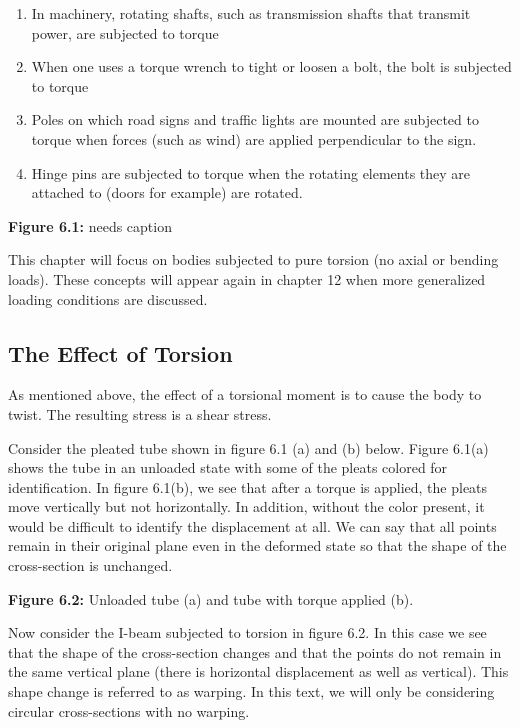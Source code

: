 \documentclass[
  letterpaper,
  DIV=11,
  numbers=noendperiod]{scrreprt}
\providecommand{\tightlist}{%
  \setlength{\itemsep}{0pt}\setlength{\parskip}{0pt}}\usepackage{longtable,booktabs,array}
\begin{document}
\begin{enumerate}
\def\labelenumi{\arabic{enumi}.}
\tightlist
\item
  In machinery, rotating shafts, such as transmission shafts that
  transmit power, are subjected to torque
\item
  When one uses a torque wrench to tight or loosen a bolt, the bolt is
  subjected to torque
\item
  Poles on which road signs and traffic lights are mounted are subjected
  to torque when forces (such as wind) are applied perpendicular to the
  sign.
\item
  Hinge pins are subjected to torque when the rotating elements they are
  attached to (doors for example) are rotated.
\end{enumerate}

\textbf{Figure 6.1:} needs caption

This chapter will focus on bodies subjected to pure torsion (no axial or
bending loads). These concepts will appear again in chapter 12 when more
generalized loading conditions are discussed.

\subsection{The Effect of Torsion}\label{the-effect-of-torsion}

As mentioned above, the effect of a torsional moment is to cause the
body to twist. The resulting stress is a shear stress.

Consider the pleated tube shown in figure 6.1 (a) and (b) below. Figure
6.1(a) shows the tube in an unloaded state with some of the pleats
colored for identification. In figure 6.1(b), we see that after a torque
is applied, the pleats move vertically but not horizontally. In
addition, without the color present, it would be difficult to identify
the displacement at all. We can say that all points remain in their
original plane even in the deformed state so that the shape of the
cross-section is unchanged.

\textbf{Figure 6.2:} Unloaded tube (a) and tube with torque applied (b).

Now consider the I-beam subjected to torsion in figure 6.2. In this case
we see that the shape of the cross-section changes and that the points
do not remain in the same vertical plane (there is horizontal
displacement as well as vertical). This shape change is referred to as
warping. In this text, we will only be considering circular
cross-sections with no warping.
\end{document}
